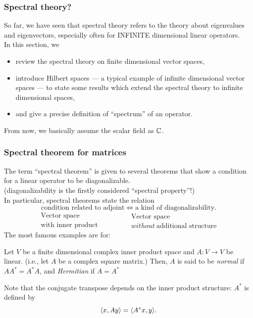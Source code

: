 \documentclass[10pt,handout]{beamer}
\begin{document}
\begin{frame}
\frametitle{Spectral theory?}
  So far, we have seen that spectral theory refers to the theory about eigenvalues and eigenvectors, \pause especially often for INFINITE dimensional linear operators.\\
  \pause In this section, we
  \begin{itemize}
    \item review the spectral theory on finite dimensional vector spaces,
    \item introduce Hilbert spaces --- a typical example of infinite dimensional vector spaces --- to state some results which extend the spectral theory to infinite dimensional spaces,
    \item and give a precise definition of ``spectrum'' of an operator.
  \end{itemize}
  \pause From now, we basically assume the scalar field as $\mathbb{C}$.
\end{frame}

\begin{frame}
\frametitle{Spectral theorem for matrices}
  The term ``spectral theorem'' is given to several theorems that show a condition for a linear operator to be diagonalizable.\\
  (diagonalizability is the firstly considered ``spectral property''!)\\
  \pause In particular, spectral theorems state the relation
  \[\text{condition related to adjoint} \iff \text{a kind of diagonalizability}.\]
  \pause \vspace{-1em}
  \[\begin{array}{c}\text{Vector space}\\\text{with inner product}\end{array}\hspace{4em}\begin{array}{c}\text{Vector space}\\without\ \text{additional structure}\end{array}\]
  \pause The most famous examples are for:
  \begin{defn}
    Let $V$ be a finite dimensional complex inner product space and $A:V\to V$ be linear.
    (i.e., let $A$ be a complex square matrix.)
    Then, $A$ is said to be \emph{normal} if $AA^*=A^*A$, and \emph{Hermitian} if $A=A^*$
  \end{defn}
  \pause Note that the conjugate transpose depends on the inner product structure: $A^*$ is defined by
  \[\langle x,Ay\rangle=\langle A^*x,y\rangle.\]
\end{frame}
\end{document}
